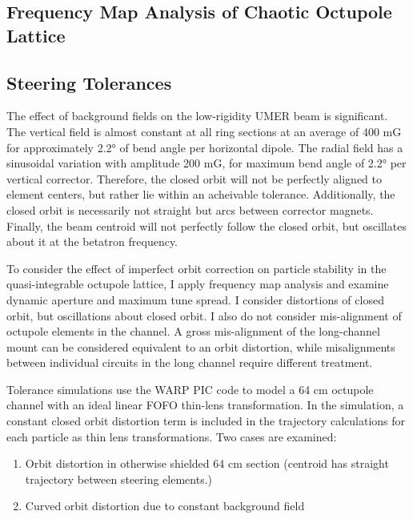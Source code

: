 \subsection{Frequency Map Analysis of Chaotic Octupole Lattice}



\subsection{Steering Tolerances}

The effect of background fields on the low-rigidity UMER beam is significant.  The vertical field is almost constant at all ring sections at an average of 400 mG for approximately 2.2° of bend angle per horizontal dipole. The radial field has a sinusoidal variation with amplitude 200 mG, for maximum bend angle of 2.2° per vertical corrector. Therefore, the closed orbit will not be perfectly aligned to element centers, but rather lie within an acheivable tolerance. Additionally, the closed orbit is necessarily not straight but arcs between corrector magnets. Finally, the beam centroid will not perfectly follow the closed orbit, but oscillates about it at the betatron frequency. 

To consider the effect of imperfect orbit correction on particle stability in the quasi-integrable octupole lattice, I apply frequency map analysis and examine dynamic aperture and maximum tune spread. I consider distortions of closed orbit, but oscillations about closed orbit. I also do not consider mis-alignment of octupole elements in the channel. A gross mis-alignment of the long-channel mount can be considered equivalent to an orbit distortion, while misalignments between individual circuits in the long channel require different treatment.

Tolerance simulations use the WARP PIC code to model a 64 cm octupole channel with an ideal linear FOFO thin-lens transformation. In the simulation, a constant closed orbit distortion term is included in the trajectory calculations for each particle as thin lens transformations. Two cases are examined:

\begin{enumerate}
\item Orbit distortion in otherwise shielded 64 cm section (centroid has straight trajectory between steering elements.)
\item Curved orbit distortion due to constant background field
\end{enumerate}


